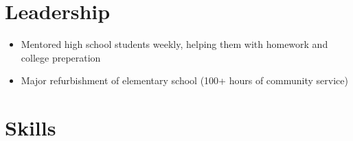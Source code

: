 \documentclass{my_cv}
\begin{document}
\section{Leadership \faBolt}
\begin{itemize}
\item Mentored high school students weekly, helping them with homework and college
  preperation
\end{itemize}
\begin{itemize}
\item Major refurbishment of elementary school (100+
hours of community service)
\end{itemize}


\section{Skills \faBullseye}



\end{document}
